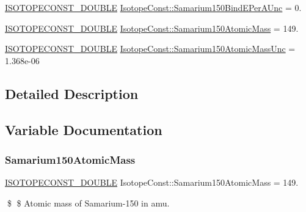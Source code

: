 \begin{DoxyCompactItemize}
\mbox{\hyperlink{group___isotope_const-_macros_ga8f45a7272ce02c0b4c65c44636ed719a}{I\+S\+O\+T\+O\+P\+E\+C\+O\+N\+S\+T\+\_\+\+D\+O\+U\+B\+LE}} \mbox{\hyperlink{group___isotope_const-_samarium-_sm150_gaf7fe38e8e255736b6ff42925857ccfe4}{Isotope\+Const\+::\+Samarium150\+Bind\+E\+Per\+A\+Unc}} = 0.
\item 
\mbox{\hyperlink{group___isotope_const-_macros_ga8f45a7272ce02c0b4c65c44636ed719a}{I\+S\+O\+T\+O\+P\+E\+C\+O\+N\+S\+T\+\_\+\+D\+O\+U\+B\+LE}} \mbox{\hyperlink{group___isotope_const-_samarium-_sm150_ga97bcc778c982048eac2cd567cc657cb2}{Isotope\+Const\+::\+Samarium150\+Atomic\+Mass}} = 149.
\item 
\mbox{\hyperlink{group___isotope_const-_macros_ga8f45a7272ce02c0b4c65c44636ed719a}{I\+S\+O\+T\+O\+P\+E\+C\+O\+N\+S\+T\+\_\+\+D\+O\+U\+B\+LE}} \mbox{\hyperlink{group___isotope_const-_samarium-_sm150_ga95815897e3955ad237427d891c7caa63}{Isotope\+Const\+::\+Samarium150\+Atomic\+Mass\+Unc}} = 1.\+368e-\/06
\end{DoxyCompactItemize}


\subsection{Detailed Description}


\subsection{Variable Documentation}
\mbox{\label{group___isotope_const-_samarium-_sm150_ga97bcc778c982048eac2cd567cc657cb2}} 
\subsubsection{\texorpdfstring{Samarium150\+Atomic\+Mass}{Samarium150AtomicMass}}
{\footnotesize\ttfamily \mbox{\hyperlink{group___isotope_const-_macros_ga8f45a7272ce02c0b4c65c44636ed719a}{I\+S\+O\+T\+O\+P\+E\+C\+O\+N\+S\+T\+\_\+\+D\+O\+U\+B\+LE}} Isotope\+Const\+::\+Samarium150\+Atomic\+Mass = 149.}

\$ \$ Atomic mass of Samarium-\/150 in amu. \mbox{\label{group___isotope_const-_samarium-_sm150_ga95815897e3955ad237427d891c7caa63}} 
